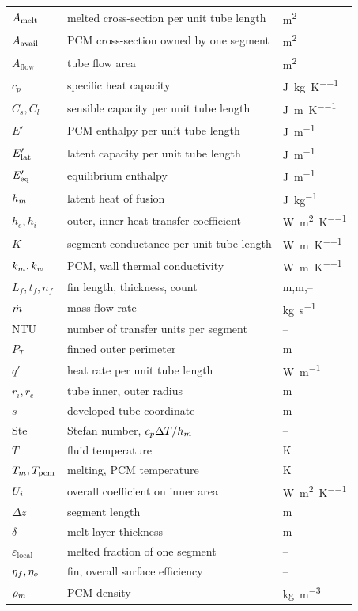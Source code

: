 \noindent
\begin{tabular}{@{}l l l@{}}
$A_{\mathrm{melt}}$ & melted cross-section per unit tube length & \si{\meter\squared} \\
$A_{\mathrm{avail}}$ & PCM cross-section owned by one segment & \si{\meter\squared} \\
$A_{\mathrm{flow}}$ & tube flow area & \si{\meter\squared} \\
$c_{p}$ & specific heat capacity & \si{\joule\per\kilogram\per\kelvin} \\
$C_{s},C_{l}$ & sensible capacity per unit tube length & \si{\joule\per\meter\per\kelvin} \\
$E'$ & PCM enthalpy per unit tube length & \si{\joule\per\meter} \\
$E'_{\mathrm{lat}}$ & latent capacity per unit tube length & \si{\joule\per\meter} \\
$E'_{\mathrm{eq}}$ & equilibrium enthalpy & \si{\joule\per\meter} \\
$h_{m}$ & latent heat of fusion & \si{\joule\per\kilogram} \\
$h_{e},h_{i}$ & outer, inner heat transfer coefficient & \si{\watt\per\meter\squared\per\kelvin} \\
$K$ & segment conductance per unit tube length & \si{\watt\per\meter\per\kelvin} \\
$k_{m},k_{w}$ & PCM, wall thermal conductivity & \si{\watt\per\meter\per\kelvin} \\
$L_{f},t_{f},n_{f}$ & fin length, thickness, count & \si{\meter},\si{\meter},-- \\
$\dot m$ & mass flow rate & \si{\kilogram\per\second} \\
$\mathrm{NTU}$ & number of transfer units per segment & -- \\
$P_{T}$ & finned outer perimeter & \si{\meter} \\
$q'$ & heat rate per unit tube length & \si{\watt\per\meter} \\
$r_{i},r_{e}$ & tube inner, outer radius & \si{\meter} \\
$s$ & developed tube coordinate & \si{\meter} \\
$\mathrm{Ste}$ & Stefan number, $c_{p}\Delta T/h_{m}$ & -- \\
$T$ & fluid temperature & \si{\kelvin} \\
$T_{m},T_{\mathrm{pcm}}$ & melting, PCM temperature & \si{\kelvin} \\
$U_{i}$ & overall coefficient on inner area & \si{\watt\per\meter\squared\per\kelvin} \\
$\Delta z$ & segment length & \si{\meter} \\
$\delta$ & melt-layer thickness & \si{\meter} \\
$\varepsilon_{\mathrm{local}}$ & melted fraction of one segment & -- \\
$\eta_{f},\eta_{o}$ & fin, overall surface efficiency & -- \\
$\rho_{m}$ & PCM density & \si{\kilogram\per\meter\cubed} \\
\end{tabular}

